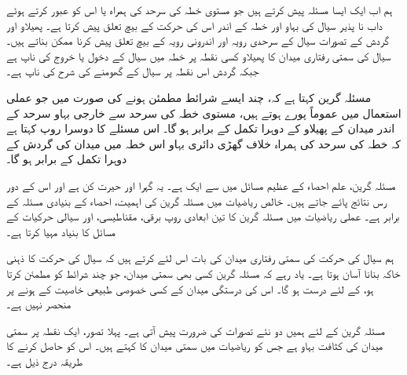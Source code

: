 ہم اب ایک ایسا مسئلہ پیش کرتے ہیں جو مستوی خطہ کی سرحد کی ہمراہ یا اس کو عبور کرتے ہوئے داب نا پذیر سیال کی بہاو اور خطہ کے اندر اس کی حرکت  کے بیچ تعلق پیش کرتا ہے۔ پھیلاو  اور گردش  کے تصورات  سیال کے سرحدی رویہ اور اندرونی رویہ کے بیچ تعلق پیش کرنا ممکن بناتے ہیں۔ سیال کی سمتی رفتاری میدان  کا پھیلاو کسی نقطہ پر  خطہ میں سیال کے دخول یا خروج کی ناپ ہے جبکہ گردش اس نقطہ پر سیال کے گھومنے کی شرح کی ناپ ہے۔

مسئلہ گرین کہتا ہے کہ، چند ایسے شرائط مطمئن ہونے کی صورت میں جو عملی استعمال میں عموماً پورے ہوتے ہیں، مستوی خطہ کی سرحد سے خارجی بہاو سرحد کے اندر  میدان کے  پھیلاو کے  دوہرا تکمل کے برابر ہو گا۔  اس مسئلے کا دوسرا روپ کہتا ہے کہ خطہ کی سرحد کی ہمراہ خلاف گھڑی دائری بہاو اس خطہ میں میدان کی گردش کے دوہرا تکمل کے برابر ہو گا۔ 

مسئلہ گرین، علم احصاء کے عظیم مسائل میں سے ایک ہے۔ یہ گہرا اور حیرت کن ہے اور اس کے  دور رس نتائج  پائے جاتے ہیں۔ خالص ریاضیات میں مسئلہ گرین کی اہمیت، احصاء کے بنیادی مسئلہ کے برابر ہے۔ عملی ریاضیات میں مسئلہ گرین کا تین ابعادی روپ برقی، مقناطیسی، اور سیالی حرکیات کے مسائل کا بنیاد مہیا کرتا ہے۔  

ہم سیال کی حرکت کی سمتی رفتاری میدان  کی بات اس لئے کرتے ہیں کہ سیال کی حرکت کا ذہنی خاکہ بنانا آسان ہوتا ہے۔ یاد رہے کہ مسئلہ گرین کسی بھی سمتی میدان، جو چند شرائط کو مطمئن کرتا ہو، کے لئے درست ہو گا۔ اس کی درستگی میدان کے کسی خصوصی طبیعی خاصیت کے ہونے  پر منحصر نہیں ہے۔  

مسئلہ گرین کے لئے ہمیں دو نئے تصورات کی ضرورت پیش آتی ہے۔ پہلا تصور، ایک نقطہ پر سمتی میدان کی کثافت بہاو ہے جس کو ریاضیات میں سمتی میدان کا  کہتے ہیں۔ اس کو حاصل کرنے کا طریقہ درج ذیل ہے۔


